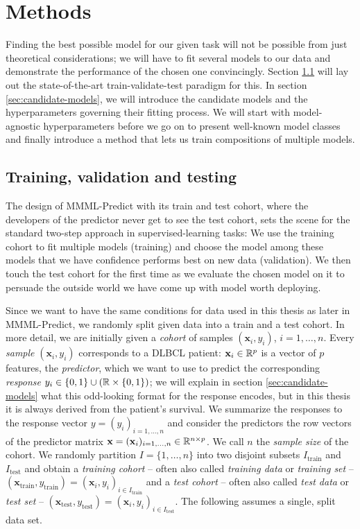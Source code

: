 \chapter{Methods} \label{chap:methods}

Finding the best possible model for our given task will not be possible from just theoretical 
considerations; we will have to fit several models to our data and demonstrate the performance of 
the chosen one convincingly. Section \ref{sec:train-val-test} will lay out the state-of-the-art 
train-validate-test paradigm for this. In section \ref{sec:candidate-models}, we will introduce 
the candidate models and the hyperparameters governing their fitting process. We will start with 
model-agnostic hyperparameters before we go on to present well-known model classes and finally 
introduce a method that lets us train compositions of multiple models.

\section{Training, validation and testing}\label{sec:train-val-test}

The design of MMML-Predict with its train and test cohort, where the developers of the predictor 
never get to see the test cohort, sets the scene for the standard two-step approach in 
supervised-learning tasks: We use the training cohort to fit multiple models (training) and choose the model
among these models that we have confidence performs best on new data (validation). We then touch 
the test cohort for the first time as we evaluate the chosen model on it to persuade the outside 
world we have come up with model worth deploying.

Since we want to have the same conditions for data used in this thesis as later in MMML-Predict,
we randomly split given data into a train and a test cohort. In more detail, we are initially given 
a \textit{cohort} of samples $(\mathbf{x}_i, y_i)$, $i = 1, \ldots, n$. Every \textit{sample}
$(\mathbf{x}_i, y_i)$ corresponds to a DLBCL patient: $\mathbf{x}_i \in \mathbb{R}^p$ is a vector of $p$ 
features, the \textit{predictor}, which we want to use to predict the corresponding \textit{response} 
$y_i \in \{0, 1\} \cup (\mathbb{R} \times \{0, 1\})$; we will explain in section \ref{sec:candidate-models} 
what this odd-looking format for the response encodes, but in this thesis it is always derived from 
the patient's survival. We summarize the 
responses to the response vector $y = (y_i)_{i = 1, \ldots, n}$ and consider the predictors the row 
vectors of the predictor matrix $\mathbf{x} = (\mathbf{x}_i)_{i = 1, \ldots, n} \in \mathbb{R}^{n \times p}$. We 
call $n$ the \textit{sample size} of the cohort. We randomly partition $I = \{1, \ldots, n\}$ into two 
disjoint subsets $I_\text{train}$ and $I_\text{test}$ and obtain a \textit{training cohort} -- often 
also called \textit{training data} or \textit{training set} --
$(\mathbf{x}_\text{train}, y_\text{train}) = (\mathbf{x}_i, y_i)_{i \in I_\text{train}}$ and a \textit{test 
cohort} -- often also called \textit{test data} or \textit{test set} -- 
$(\mathbf{x}_\text{test}, y_\text{test}) = (\mathbf{x}_i, y_i)_{i \in I_\text{test}}$. The following assumes 
a single, split data set.

